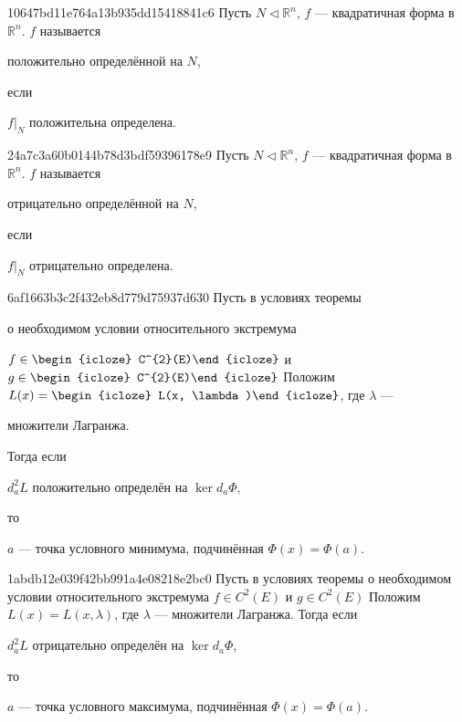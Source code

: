 \begin{note}{10647bd11e764a13b935dd15418841c6}
    Пусть \({ N \triangleleft \mathbb R^{n} }\), \({ f }\) --- квадратичная форма в \({ \mathbb R^{n} }\).
    \({ f }\) называется \begin{icloze}{2}положительно определённой на \({ N }\),\end{icloze} если \begin{icloze}{1}\({ f|_{N} }\) положительна определена.\end{icloze}
\end{note}

\begin{note}{24a7c3a60b0144b78d3bdf59396178e9}
    Пусть \({ N \triangleleft \mathbb R^{n} }\), \({ f }\) --- квадратичная форма в \({ \mathbb R^{n} }\).
    \({ f }\) называется \begin{icloze}{2}отрицательно определённой на \({ N }\),\end{icloze} если \begin{icloze}{1}\({ f|_{N} }\) отрицательно определена.\end{icloze}
\end{note}

\begin{note}{6af1663b3c2f432eb8d779d75937d630}
    Пусть в условиях теоремы \begin{icloze}{6}о необходимом условии относительного экстремума\end{icloze} \({ f \in \begin{icloze}{5}C^{2}(E)\end{icloze} }\) и \({ g \in \begin{icloze}{5}C^{2}(E)\end{icloze} }\)
    Положим \({ L(x) = \begin{icloze}{4}L(x, \lambda)\end{icloze} }\), где \({ \lambda }\) --- \begin{icloze}{3}множители Лагранжа.\end{icloze}
    Тогда если \begin{icloze}{1}\({ d_{a}^2L }\) положительно определён на \({ \ker d_{a}\Phi }\),\end{icloze} то \begin{icloze}{2}\({ a }\) --- точка условного минимума, подчинённая \({ \Phi(x) = \Phi(a) }\).\end{icloze}
\end{note}

\begin{note}{1abdb12e039f42bb991a4e08218e2bc0}
    Пусть в условиях теоремы о необходимом условии относительного экстремума \({ f \in C^{2}(E) }\) и \({ g \in C^{2}(E) }\)
    Положим \({ L(x) = L(x, \lambda) }\), где \({ \lambda }\) --- множители Лагранжа.
    Тогда если \begin{icloze}{1}\({ d_{a}^2L }\) отрицательно определён на \({ \ker d_{a}\Phi }\),\end{icloze} то \begin{icloze}{2}\({ a }\) --- точка условного максимума, подчинённая \({ \Phi(x) = \Phi(a) }\).\end{icloze}
\end{note}

